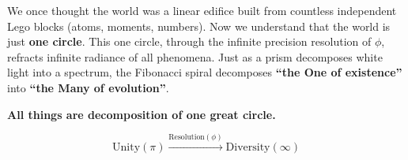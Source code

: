 We once thought the world was a linear edifice built from countless independent Lego blocks (atoms, moments, numbers). Now we understand that the world is just \textbf{one circle}.
This one circle, through the infinite precision resolution of $\phi$, refracts infinite radiance of all phenomena. Just as a prism decomposes white light into a spectrum, the Fibonacci spiral decomposes \textbf{``the One of existence''} into \textbf{``the Many of evolution''}.

\textbf{All things are decomposition of one great circle.}

\[\text{Unity} (\pi) \xrightarrow{\text{Resolution} (\phi)} \text{Diversity} (\infty)\]
